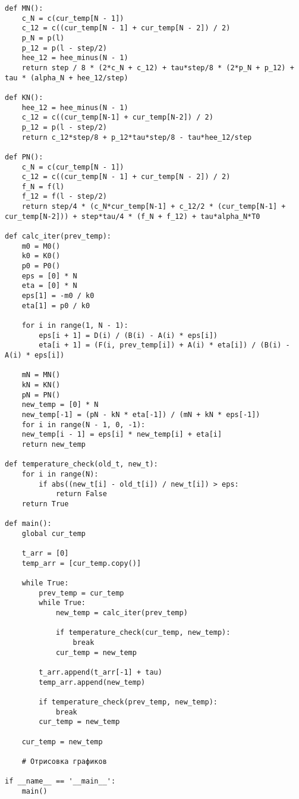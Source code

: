 \begin{lstlisting}[label=code1, caption = Лабораторная работа №3]
def MN():
	c_N = c(cur_temp[N - 1])
	c_12 = c((cur_temp[N - 1] + cur_temp[N - 2]) / 2)
	p_N = p(l)
	p_12 = p(l - step/2)
	hee_12 = hee_minus(N - 1)
	return step / 8 * (2*c_N + c_12) + tau*step/8 * (2*p_N + p_12) + tau * (alpha_N + hee_12/step)

def KN():
	hee_12 = hee_minus(N - 1)
	c_12 = c((cur_temp[N-1] + cur_temp[N-2]) / 2)
	p_12 = p(l - step/2)
	return c_12*step/8 + p_12*tau*step/8 - tau*hee_12/step

def PN():
	c_N = c(cur_temp[N - 1])
	c_12 = c((cur_temp[N - 1] + cur_temp[N - 2]) / 2)
	f_N = f(l)
	f_12 = f(l - step/2)
	return step/4 * (c_N*cur_temp[N-1] + c_12/2 * (cur_temp[N-1] + cur_temp[N-2])) + step*tau/4 * (f_N + f_12) + tau*alpha_N*T0

def calc_iter(prev_temp):
	m0 = M0()
	k0 = K0()
	p0 = P0()
	eps = [0] * N
	eta = [0] * N
	eps[1] = -m0 / k0
	eta[1] = p0 / k0
	
	for i in range(1, N - 1):
		eps[i + 1] = D(i) / (B(i) - A(i) * eps[i])
		eta[i + 1] = (F(i, prev_temp[i]) + A(i) * eta[i]) / (B(i) - A(i) * eps[i])
	
	mN = MN()
	kN = KN()
	pN = PN()
	new_temp = [0] * N
	new_temp[-1] = (pN - kN * eta[-1]) / (mN + kN * eps[-1])
	for i in range(N - 1, 0, -1):
	new_temp[i - 1] = eps[i] * new_temp[i] + eta[i]
	return new_temp

def temperature_check(old_t, new_t):
	for i in range(N):
		if abs((new_t[i] - old_t[i]) / new_t[i]) > eps:
			return False
	return True

def main():
	global cur_temp

	t_arr = [0]
	temp_arr = [cur_temp.copy()]

	while True:
		prev_temp = cur_temp
		while True:
			new_temp = calc_iter(prev_temp)
			
			if temperature_check(cur_temp, new_temp):
				break
			cur_temp = new_temp
		
		t_arr.append(t_arr[-1] + tau)
		temp_arr.append(new_temp)
		
		if temperature_check(prev_temp, new_temp):
			break
		cur_temp = new_temp
	
	cur_temp = new_temp
	
	# Отрисовка графиков

if __name__ == '__main__':
	main()
\end{lstlisting}